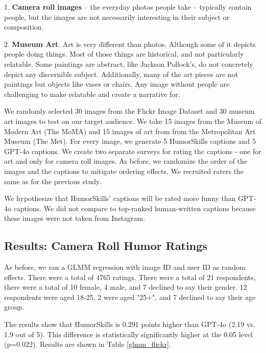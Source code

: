 1. \textbf{Camera roll images} -- the everyday photos people take -- typically contain people, but the images are not necessarily interesting in their subject or composition. 

2. \textbf{Museum Art}. Art is very different than photos. Although some of it depicts people doing things. Most of those things are historical, and not particularly relatable. Some paintings are abstract, like Jackson Pollock's, do not concretely depict any discernible subject. Additionally, many of the art pieces are not paintings but objects like vases or chairs. Any image without people are challenging to make relatable and create a narrative for.

We randomly selected 30 images from the Flickr Image Dataset\cite{young2014image} and 30 museum art images to test on our target audience. We take 15 images from the Museum of Modern Art (The MoMA) and 15 images of art from from the Metropolitan Art Museum (The Met). For every image, we generate 5 HumorSkills captions and 5 GPT-4o captions. We create two separate surveys for rating the captions - one for art and only for camera roll images. As before, we randomize the order of the images and the captions to mitigate ordering effects. We recruited raters the same as for the previous study.

We hypothesize that HumorSkills' captions will be rated more funny than GPT-4o captions. We did not compare to top-ranked human-written captions because these images were not taken from Instagram.

\subsection{Results: Camera Roll Humor Ratings}
As before, we ran a GLMM regression with image ID and user ID as random effects. There were a total of 4765 ratings. There were a total of 21 respondents, there were a total of 10 female, 4 male, and 7 declined to say their gender. 12 respondents were aged 18-25, 2 were aged "25+", and 7 declined to say their age group.

The results show that HumorSkills is 0.291 points higher than GPT-4o (2.19 vs. 1.9 out of 5). This difference is statistically significantly higher at the 0.05 level (p=0.022). Results are shown in Table \ref{glmm_flickr}.


